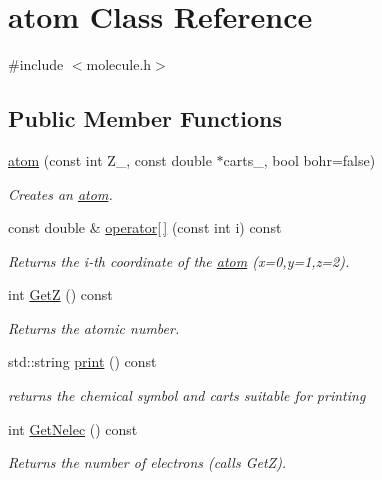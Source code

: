 \hypertarget{classJKBuilder_1_1atom}{
\section{atom Class Reference}
\label{classJKBuilder_1_1atom}
}


{\ttfamily \#include $<$molecule.h$>$}\subsection*{Public Member Functions}
\begin{DoxyCompactItemize}
\item 
\hyperlink{classJKBuilder_1_1atom_a093b616ad3671037f440a6fa34ab6355}{atom} (const int Z\_\-, const double $\ast$carts\_\-, bool bohr=false)
\begin{DoxyCompactList}\small\item\em Creates an \hyperlink{classJKBuilder_1_1atom}{atom}. \item\end{DoxyCompactList}\item 
const double \& \hyperlink{classJKBuilder_1_1atom_a4f0dc1b84b580cec49500c70f87e084a}{operator\mbox{[}$\,$\mbox{]}} (const int i) const 
\begin{DoxyCompactList}\small\item\em Returns the i-\/th coordinate of the \hyperlink{classJKBuilder_1_1atom}{atom} (x=0,y=1,z=2). \item\end{DoxyCompactList}\item 
int \hyperlink{classJKBuilder_1_1atom_a57becd9a69927a5ba8ae251a7790dc2a}{GetZ} () const 
\begin{DoxyCompactList}\small\item\em Returns the atomic number. \item\end{DoxyCompactList}\item 
std::string \hyperlink{classJKBuilder_1_1atom_a41d45f22912b0c077a76b7a4234599b6}{print} () const 
\begin{DoxyCompactList}\small\item\em returns the chemical symbol and carts suitable for printing \item\end{DoxyCompactList}\item 
int \hyperlink{classJKBuilder_1_1atom_aeb29d9144c99d302f7b43d5398929ea5}{GetNelec} () const 
\begin{DoxyCompactList}\small\item\em Returns the number of electrons (calls GetZ). \item\end{DoxyCompactList}\end{DoxyCompactItemize}
